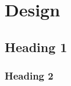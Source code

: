 \chapter[Design]{Design}
\label{Chap:Design}




\section{Heading 1}


\subsection{Heading 2}
\lipsum[4]

